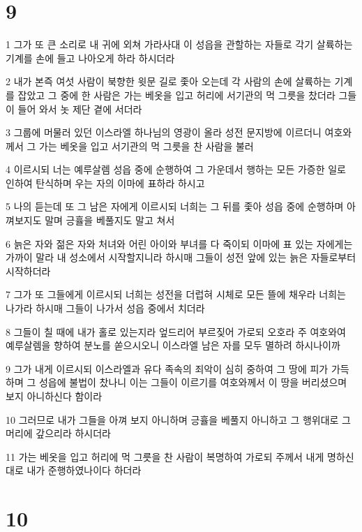 \chapter{9}

\par 1 그가 또 큰 소리로 내 귀에 외쳐 가라사대 이 성읍을 관할하는 자들로 각기 살륙하는 기계를 손에 들고 나아오게 하라 하시더라
\par 2 내가 본즉 여섯 사람이 북향한 윗문 길로 좇아 오는데 각 사람의 손에 살륙하는 기계를 잡았고 그 중에 한 사람은 가는 베옷을 입고 허리에 서기관의 먹 그릇을 찼더라 그들이 들어 와서 놋 제단 곁에 서더라
\par 3 그룹에 머물러 있던 이스라엘 하나님의 영광이 올라 성전 문지방에 이르더니 여호와께서 그 가는 베옷을 입고 서기관의 먹 그릇을 찬 사람을 불러
\par 4 이르시되 너는 예루살렘 성읍 중에 순행하여 그 가운데서 행하는 모든 가증한 일로 인하여 탄식하며 우는 자의 이마에 표하라 하시고
\par 5 나의 듣는데 또 그 남은 자에게 이르시되 너희는 그 뒤를 좇아 성읍 중에 순행하며 아껴보지도 말며 긍휼을 베풀지도 말고 쳐서
\par 6 늙은 자와 젊은 자와 처녀와 어린 아이와 부녀를 다 죽이되 이마에 표 있는 자에게는 가까이 말라 내 성소에서 시작할지니라 하시매 그들이 성전 앞에 있는 늙은 자들로부터 시작하더라
\par 7 그가 또 그들에게 이르시되 너희는 성전을 더럽혀 시체로 모든 뜰에 채우라 너희는 나가라 하시매 그들이 나가서 성읍 중에서 치더라
\par 8 그들이 칠 때에 내가 홀로 있는지라 엎드리어 부르짖어 가로되 오호라 주 여호와여 예루살렘을 향하여 분노를 쏟으시오니 이스라엘 남은 자를 모두 멸하려 하시나이까
\par 9 그가 내게 이르시되 이스라엘과 유다 족속의 죄악이 심히 중하여 그 땅에 피가 가득하며 그 성읍에 불법이 찼나니 이는 그들이 이르기를 여호와께서 이 땅을 버리셨으며 보지 아니하신다 함이라
\par 10 그러므로 내가 그들을 아껴 보지 아니하며 긍휼을 베풀지 아니하고 그 행위대로 그 머리에 갚으리라 하시더라
\par 11 가는 베옷을 입고 허리에 먹 그릇을 찬 사람이 복명하여 가로되 주께서 내게 명하신 대로 내가 준행하였나이다 하더라

\chapter{10}

